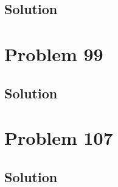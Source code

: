 \documentclass[12pt]{article}
\begin{document}
        \subsection{Solution}

    \pagebreak
    \section{Problem 99}

        \subsection{Solution}

    \pagebreak
    \section{Problem 107}

        \subsection{Solution}

    \pagebreak

    \tableofcontents
\end{document}
